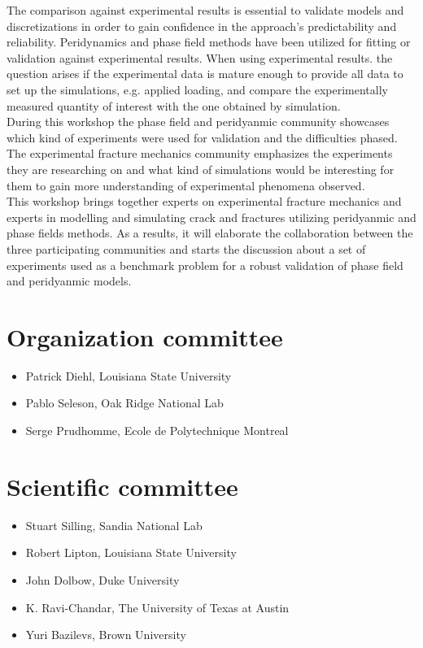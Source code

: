 The comparison against experimental results is essential to validate models and discretizations in order to gain confidence in the approach’s predictability and reliability. Peridynamics and phase field methods have been utilized for fitting or validation against experimental results. When using experimental results. the question arises if the experimental data is mature enough to provide all data to set up the simulations, e.g. applied loading, and compare the experimentally measured quantity of interest with the one obtained by simulation. \\

During this workshop the phase field and peridyanmic community showcases which kind of experiments were used for validation and the difficulties phased. The experimental fracture mechanics community emphasizes the experiments they are researching on and what kind of simulations would be interesting for them to gain more understanding of experimental phenomena observed. \\

This workshop brings together experts on experimental fracture mechanics and experts in modelling and simulating crack and fractures utilizing peridyanmic and phase fields methods. As a results, it will elaborate the collaboration between the three participating communities and starts the discussion about a set of experiments used as a benchmark problem for a robust validation of phase field and peridyanmic models.

\section*{Organization committee }
\begin{itemize}
\item Patrick Diehl, Louisiana State University
\item Pablo Seleson, Oak Ridge National Lab
\item Serge Prudhomme, Ecole de Polytechnique Montreal
\end{itemize}

\section*{Scientific committee}
\begin{itemize}
\item Stuart Silling, Sandia National Lab
\item Robert Lipton, Louisiana State University
\item John Dolbow, Duke University
\item K. Ravi-Chandar, The University of Texas at Austin
\item Yuri Bazilevs, Brown University 
\end{itemize}
